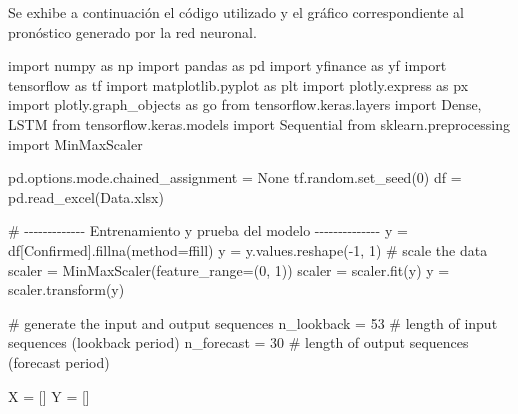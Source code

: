 \documentclass[
  us-letterpaper,
]{scrreprt}
\newenvironment{Shaded}{\begin{snugshade}}{\end{snugshade}}
\newcommand{\CommentTok}[1]{\textcolor[rgb]{0.37,0.37,0.37}{#1}}
\newcommand{\DecValTok}[1]{\textcolor[rgb]{0.68,0.00,0.00}{#1}}
\newcommand{\ImportTok}[1]{\textcolor[rgb]{0.00,0.46,0.62}{#1}}
\newcommand{\NormalTok}[1]{\textcolor[rgb]{0.00,0.23,0.31}{#1}}
\newcommand{\OperatorTok}[1]{\textcolor[rgb]{0.37,0.37,0.37}{#1}}
\newcommand{\StringTok}[1]{\textcolor[rgb]{0.13,0.47,0.30}{#1}}
\newcommand{\VariableTok}[1]{\textcolor[rgb]{0.07,0.07,0.07}{#1}}
\theoremstyle{plain}
\theoremstyle{definition}
\theoremstyle{definition}
\theoremstyle{plain}
\theoremstyle{remark}
\begin{document}
Se exhibe a continuación el código utilizado y el gráfico
correspondiente al pronóstico generado por la red neuronal.

\begin{Shaded}
\begin{Highlighting}[]
\ImportTok{import}\NormalTok{ numpy }\ImportTok{as}\NormalTok{ np}
\ImportTok{import}\NormalTok{ pandas }\ImportTok{as}\NormalTok{ pd}
\ImportTok{import}\NormalTok{ yfinance }\ImportTok{as}\NormalTok{ yf}
\ImportTok{import}\NormalTok{ tensorflow }\ImportTok{as}\NormalTok{ tf}
\ImportTok{import}\NormalTok{ matplotlib.pyplot }\ImportTok{as}\NormalTok{ plt}
\ImportTok{import}\NormalTok{ plotly.express }\ImportTok{as}\NormalTok{ px}
\ImportTok{import}\NormalTok{ plotly.graph\_objects }\ImportTok{as}\NormalTok{ go}
\ImportTok{from}\NormalTok{ tensorflow.keras.layers }\ImportTok{import}\NormalTok{ Dense, LSTM}
\ImportTok{from}\NormalTok{ tensorflow.keras.models }\ImportTok{import}\NormalTok{ Sequential}
\ImportTok{from}\NormalTok{ sklearn.preprocessing }\ImportTok{import}\NormalTok{ MinMaxScaler}

\NormalTok{pd.options.mode.chained\_assignment }\OperatorTok{=} \VariableTok{None}
\NormalTok{tf.random.set\_seed(}\DecValTok{0}\NormalTok{)}
\NormalTok{df }\OperatorTok{=}\NormalTok{ pd.read\_excel(}\StringTok{\textquotesingle{}Data.xlsx\textquotesingle{}}\NormalTok{)}

\CommentTok{\# {-}{-}{-}{-}{-}{-}{-}{-}{-}{-}{-}{-}{-} Entrenamiento y prueba del modelo {-}{-}{-}{-}{-}{-}{-}{-}{-}{-}{-}{-}{-}{-}}
\NormalTok{y }\OperatorTok{=}\NormalTok{ df[}\StringTok{\textquotesingle{}Confirmed\textquotesingle{}}\NormalTok{].fillna(method}\OperatorTok{=}\StringTok{\textquotesingle{}ffill\textquotesingle{}}\NormalTok{)}
\NormalTok{y }\OperatorTok{=}\NormalTok{ y.values.reshape(}\OperatorTok{{-}}\DecValTok{1}\NormalTok{, }\DecValTok{1}\NormalTok{)}
\CommentTok{\# scale the data}
\NormalTok{scaler }\OperatorTok{=}\NormalTok{ MinMaxScaler(feature\_range}\OperatorTok{=}\NormalTok{(}\DecValTok{0}\NormalTok{, }\DecValTok{1}\NormalTok{))}
\NormalTok{scaler }\OperatorTok{=}\NormalTok{ scaler.fit(y)}
\NormalTok{y }\OperatorTok{=}\NormalTok{ scaler.transform(y)}

\CommentTok{\# generate the input and output sequences}
\NormalTok{n\_lookback }\OperatorTok{=} \DecValTok{53}  \CommentTok{\# length of input sequences (lookback period)}
\NormalTok{n\_forecast }\OperatorTok{=} \DecValTok{30}  \CommentTok{\# length of output sequences (forecast period)}

\NormalTok{X }\OperatorTok{=}\NormalTok{ []}
\NormalTok{Y }\OperatorTok{=}\NormalTok{ []}


\end{Highlighting}
\end{Shaded}
\end{document}

